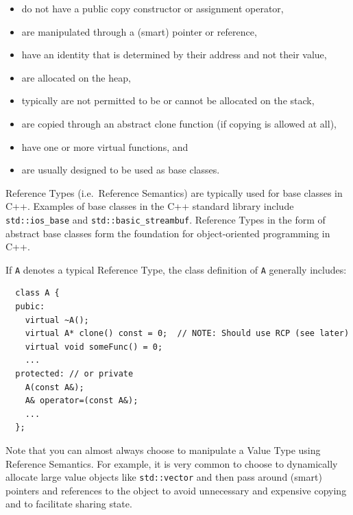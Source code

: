 \documentclass[pdf,ps2pdf,11pt]{SANDreport}
\begin{document}
\begin{itemize}

{}\item do not have a public copy constructor or assignment operator,

{}\item are manipulated through a (smart) pointer or reference,

{}\item have an identity that is determined by their address and not
their value,

{}\item are allocated on the heap,

{}\item typically are not permitted to be or cannot be allocated on
the stack,

{}\item are copied through an abstract clone function (if copying is
allowed at all),

{}\item have one or more virtual functions, and

{}\item are usually designed to be used as base classes.

\end{itemize}

Reference Types (i.e.\ Reference Semantics) are typically used for base
classes in C++.  Examples of base classes in the C++ standard library
include {}\texttt{std::ios\_base} and
{}\texttt{std::basic\_streambuf}.  Reference Types in the form of
abstract base classes form the foundation for object-oriented
programming in C++.

If {}\texttt{A} denotes a typical Reference Type, the class definition
of {}\texttt{A} generally includes:

{\small\begin{verbatim}
  class A {
  pubic:
    virtual ~A();
    virtual A* clone() const = 0;  // NOTE: Should use RCP (see later)
    virtual void someFunc() = 0;
    ...
  protected: // or private
    A(const A&);
    A& operator=(const A&);
    ...
  };
\end{verbatim}}

Note that you can almost always choose to manipulate a Value Type
using Reference Semantics.  For example, it is very common to choose
to dynamically allocate large value objects like
{}\texttt{std::vector} and then pass around (smart) pointers and
references to the object to avoid unnecessary and expensive copying
and to facilitate sharing state.
\end{document}
